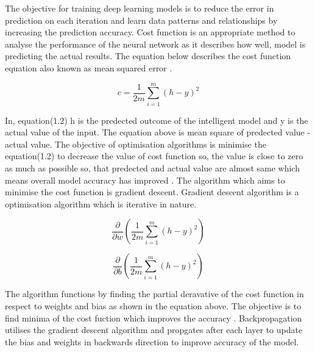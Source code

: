 The objective for training deep learning models is to reduce
the error in prediction on each iteration and 
learn data patterns and relationships by increasing the 
prediction accuracy. Cost function is an appropriate method to 
analyse the performance of the neural network as it describes 
how well, model is predicting the actual results. The equation below 
describes the cost function equation also known as mean squared error \citep*{7013173}.
\vspace{2mm}

\begin{center}
\begin{equation}
    c = \frac{1}{2m} \sum_{i=1}^m(h - y)^2
\end{equation}
\end{center}

In, equation(1.2)  h is the predected outcome of the intelligent model 
and y is the actual value of the input. The equation above is mean square of 
predected value - actual value. The objective of optimisation algorithms is 
minimise the equation(1.2) to decrease the value of cost function so, the value is 
close to zero as much as possible so, that predected and actual 
value are almost same which means overall model accuracy has improved \citep*{7013173}.
The algorithm which aims to minimise the cost function is gradient descent. Gradient descent algorithm 
is a optimisation algorithm which is iterative in nature. 

\begin{center}
    \begin{equation}
            \frac{\partial }{\partial w} (\frac{1}{2m} \sum_{i=1}^m(h - y)^2)
    \end{equation}

    \begin{equation}
        \frac{\partial }{\partial b} (\frac{1}{2m} \sum_{i=1}^m(h - y)^2) 
    \end{equation}
\end{center}


The algorithm functions by finding the 
partial deravative of the cost function in respect to weights and bias as shown in the equation above.
The objective is to find minima of the cost fuction which improves the accuracy \citep*{7013173}. 
Backpropagation utilises the gradient descent algorithm and propgates after each layer to 
update the bias and weights in backwards direction to improve accuracy of the model. 